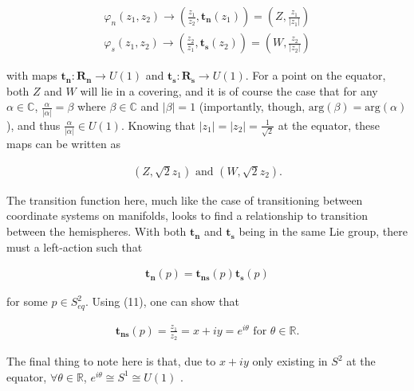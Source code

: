 \documentclass[fleqn, twocolumn, 10pt]{article}
\begin{document}
\begin{ceqn}
\begin{align*}
\varphi_n(z_1, z_2) \to \left(\frac{z_1}{z_2}, \mathbf{t_n}(z_1)\right) = \left(Z, \frac{z_1}{\rvert z_1\rvert}\right)\\ 
\varphi_s(z_1, z_2) \to \left(\frac{z_2}{z_1}, \mathbf{t_s}(z_2)\right) = \left(W, \frac{z_2}{\rvert z_2\rvert}\right) 
\end{align*}
\end{ceqn}
with maps $\mathbf{t_n}: \mathbf{R_n} \to U(1)$ and $\mathbf{t_s}: \mathbf{R_s} \to U(1)$. For a point on the equator, both $Z$ and $W$ will lie in a covering, and it is of course the case that for any $\alpha \in \mathbb{C}$, $\frac{\alpha}{\rvert \alpha\rvert} = \beta$ where $\beta \in \mathbb{C}$ and $\rvert \beta\rvert = 1$ (importantly, though, $\text{arg}(\beta) = \text{arg}(\alpha)$), and thus $\frac{\alpha}{\rvert \alpha\rvert} \in U(1)$. Knowing that $\rvert z_1\rvert = \rvert z_2\rvert = \frac{1}{\sqrt{2}}$ at the equator, these maps can be written as 

\begin{ceqn}
\begin{align}\tag{11}
(Z, \sqrt{2}z_1)  \text{ and } (W, \sqrt{2}z_2). 
\end{align}
\end{ceqn}

The transition function here, much like the case of transitioning between coordinate systems on manifolds, looks to find a relationship to transition between the hemispheres. With both $\mathbf{t_n}$ and $\mathbf{t_s}$ being in the same Lie group, there must a left-action such that 

\begin{ceqn}
\begin{align*}
\mathbf{t_n}(p) =  \mathbf{t_{ns}}(p)\mathbf{t_s}(p)
\end{align*}
\end{ceqn}
for some $p \in S^2_{eq}$. Using (11), one can show that 

\begin{ceqn}
\begin{align}\tag{12}
\mathbf{t_{ns}}(p) = \frac{z_1}{z_2} = x + iy = e^{i\theta} \text{ for } \theta \in \mathbb{R}.
\end{align}
\end{ceqn}
The final thing to note here is that, due to $x + iy$ only existing in $S^2$ at the equator, $\forall \theta \in \mathbb{R}$, $e^{i\theta} \cong S^1 \cong U(1)$ \cite{nakahara2003geometry, roos2018hopf, hopf1931map, niles2011hopf, scaletta2010hopf, mazzoni2017bundles, rupert2008dynamics}.  
\end{document}
